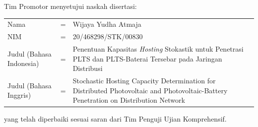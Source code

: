 \vspace*{8pt}
\BgThispage
\noindent Tim Promotor menyetujui naskah disertasi:
\vspace*{-8pt}
{
\begin{longtable}{llp{264pt}}
	\hspace*{-11pt}Nama						& = & Wijaya Yudha Atmaja\\
	\hspace*{-11pt}NIM						& = & 20/468298/STK/00830\\
	\hspace*{-11pt}Judul (Bahasa Indonesia)	& = & Penentuan Kapasitas \textit{Hosting} Stokastik untuk Penetrasi PLTS dan PLTS-Baterai Tersebar pada Jaringan Distribusi\\
	\hspace*{-11pt}Judul	(Bahasa Inggris) 	& = & Stochastic Hosting Capacity Determination for Distributed Photovoltaic and Photovoltaic-Battery Penetration on Distribution Network
\end{longtable}
}
\vspace*{-22pt}
\noindent yang telah diperbaiki sesuai saran dari Tim Penguji Ujian Komprehensif.
\vspace*{4cm}

